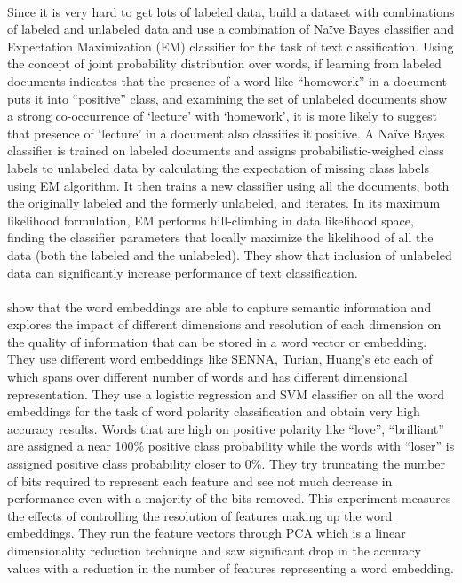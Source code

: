 \documentclass[a4paper,26pt]{article}
\begin{document}
\paragraph{}
Since it is very hard to get lots of labeled data, \cite{nigam2000text} build a dataset with combinations of labeled and unlabeled data and use a combination of Na\"{i}ve Bayes classifier and Expectation Maximization (EM) classifier for the task of text classification. Using the concept of joint probability distribution over words, if learning from labeled documents indicates that the presence of a word like ``homework'' in a document puts it into ``positive'' class, and examining the set of unlabeled documents show a strong co-occurrence of `lecture' with `homework', it is more likely to suggest that presence of `lecture' in a document also classifies it positive. A Na\"{i}ve Bayes classifier is trained on labeled documents and assigns probabilistic-weighed class labels to unlabeled data by calculating the expectation of missing class labels using EM algorithm. It then trains a new classifier using all the documents, both the originally labeled and the formerly unlabeled, and iterates. In its maximum likelihood formulation, EM performs hill-climbing in data likelihood space, finding the classifier parameters that locally maximize the likelihood of all the data (both the labeled and the unlabeled). They show that inclusion of unlabeled data can significantly increase performance of text classification.

\paragraph{}
\cite{chen2013expressive} show that the word embeddings are able to capture semantic information and explores the impact of different dimensions and resolution of each dimension on the quality of information that can be stored in a word vector or embedding. They use different word embeddings like SENNA, Turian, Huang's etc each of which spans over different number of words and has different dimensional representation. They use a logistic regression and SVM classifier on all the word embeddings for the task of word polarity classification and obtain very high accuracy results. Words that are high on positive polarity like ``love'', ``brilliant'' are assigned a near 100\% positive class probability while the words with ``loser'' is assigned positive class probability closer to $0\%$. They try truncating the number of bits required to represent each feature and see not much decrease in performance even with a majority of the bits removed. This experiment measures the effects of controlling the resolution of features making up the word embeddings. They run the feature vectors through PCA which is a linear dimensionality reduction technique and saw significant drop in the accuracy values with a reduction in the number of features representing a word embedding.
\end{document}
